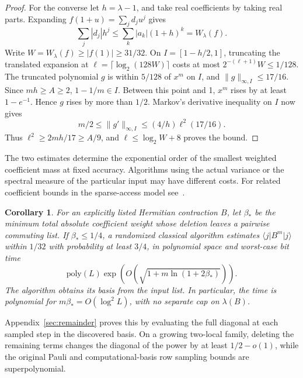 \documentclass[11pt]{article}
\newtheorem{samplingcor}{Corollary}[theorem]
\newcommand{\ket}[1]{\lvert #1\rangle}
\newcommand{\bra}[1]{\langle #1\rvert}
\begin{document}
\begin{proof}
For the converse let \(h=\lambda-1\), and take real coefficients by taking real parts. Expanding \(f(1+u)=\sum_j d_j u^j\) gives
\[
 \sum_j|d_j|h^j\le\sum_k |a_k|(1+h)^k=W_\lambda(f).
\]
Write \(W=W_\lambda(f)\ge |f(1)|\ge31/32\). On \(I=[1-h/2,1]\), truncating the translated expansion at \(\ell=\lceil\log_2(128W)\rceil\) costs at most \(2^{-(\ell+1)}W\le1/128\). The truncated polynomial \(g\) is within \(5/128\) of \(x^m\) on \(I\), and \(\|g\|_{\infty,I}\le17/16\). Since \(mh\ge A\ge2\), \(1-1/m\in I\). Between this point and 1, \(x^m\) rises by at least \(1-e^{-1}\). Hence \(g\) rises by more than \(1/2\). Markov's derivative inequality on \(I\) now gives
\[
 m/2\le\|g'\|_{\infty,I}\le(4/h)\ell^2(17/16).
\]
Thus \(\ell^2\ge 2mh/17\ge A/9\), and \(\ell\le\log_2 W+8\) proves the bound.
\end{proof}
The two estimates determine the exponential order of the smallest weighted coefficient mass at fixed accuracy. Algorithms using the actual variance or the spectral measure of the particular input may have different costs. For related coefficient bounds in the sparse-access model see~\cite[Sec.~5]{ms}.

\begin{samplingcor}\label{cor:remainder}
For an explicitly listed Hermitian contraction \(B\), let \(\beta_*\) be the minimum total absolute coefficient weight whose deletion leaves a pairwise commuting list. If \(\beta_*\le1/4\), a randomized classical algorithm estimates \(\bra j B^m\ket j\) within \(1/32\) with probability at least \(3/4\), in polynomial space and worst-case bit time
\[
 \mathrm{poly}(L)\exp\!\left(O\!\left(\sqrt{1+m\ln(1+2\beta_*)}\right)\right).
\]
The algorithm obtains its basis from the input list. In particular, the time is polynomial for \(m\beta_*=O(\log^2 L)\), with no separate cap on \(\lambda(B)\).
\end{samplingcor}
Appendix~\ref{sec:remainder} proves this by evaluating the full diagonal at each sampled step in the discovered basis. On a growing two-local family, deleting the remaining terms changes the diagonal of the power by at least \(1/2-o(1)\), while the original Pauli and computational-basis row sampling bounds are superpolynomial.
\end{document}
